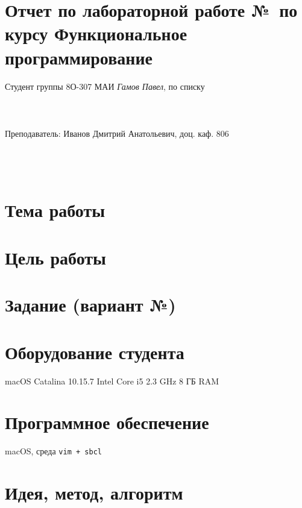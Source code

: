 \documentclass[15pt]{extarticle}
\begin{document}
\section*{Отчет по лабораторной работе №\,
по курсу \guillemotleft  Функциональное программирование\guillemotright}

\begin{flushright}
Студент группы 8О-307 МАИ \textit{Гамов Павел},  по списку \\
 \\
 \\
\ \\
Преподаватель: Иванов Дмитрий Анатольевич, доц. каф. 806 \\
 \\
 \\
 \\

\end{flushright}

\section{Тема работы}


\section{Цель работы}


\section{Задание (вариант №)}

\section{Оборудование студента}
macOS Catalina 10.15.7 Intel Core i5 2.3 GHz 8 ГБ RAM

\section{Программное обеспечение}
macOS, среда {\tt vim + sbcl}

\section{Идея, метод, алгоритм}
\end{document}
